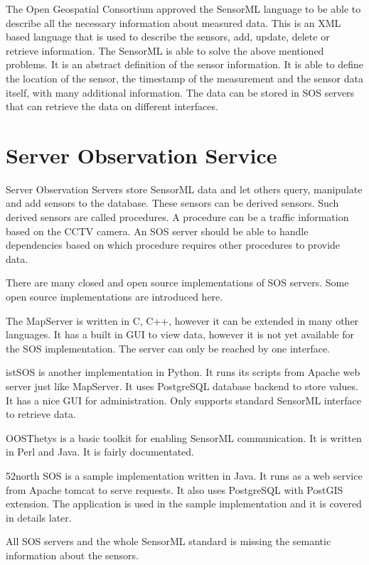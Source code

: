 The Open Geospatial Consortium approved the SensorML language to be able to describe all the necessary information about measured data\cite{sensorml}. This is an XML based language that is used to describe the sensors, add, update, delete or retrieve information. The SensorML is able to solve the above mentioned problems. It is an abstract definition of the sensor information.
It is able to define the location of the sensor, the timestamp of the measurement and the sensor data itself, with many additional information. The data can be stored in SOS servers that can retrieve the data on different interfaces.
 
\section{Server Observation Service}

Server Observation Servers store SensorML data and let others query, manipulate and add sensors to the database. These sensors can be derived sensors. Such derived sensors are called procedures. A procedure can be a traffic information based on the CCTV camera. An SOS server should be able to handle dependencies based on which procedure requires other procedures to provide data.

There are many closed and open source implementations of SOS servers. Some open source implementations are introduced here.

The MapServer is written in C, C++, however it can be extended in many other languages\cite{mapserver}. It has a built in GUI to view data, however it is not yet available for the SOS implementation. The server can only be reached by one interface.

istSOS is another implementation in Python\cite{istsos}. It runs its scripts from Apache web server just like MapServer. It uses PostgreSQL database backend to store values. It has a nice GUI for administration. Only supports standard SensorML interface to retrieve data.

OOSThetys is a basic toolkit for enabling SensorML communication. It is written in Perl and Java. It is fairly documentated. 

52north SOS is a sample implementation written in Java\cite{52north}. It runs as a web service from Apache tomcat to serve requests. It also uses PostgreSQL with PostGIS extension. The application is used in the sample implementation and it is covered in details later.

All SOS servers and the whole SensorML standard is missing the semantic information about the sensors.

